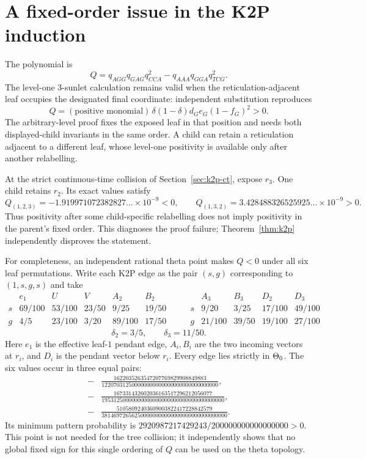 \documentclass[11pt]{article}
\theoremstyle{remark}\newtheorem{remark}[theorem]{Remark}
\begin{document}
\section{A fixed-order issue in the K2P induction}\label{sec:induction}
The polynomial is
\begin{equation}\label{eq:Q}Q=q_{AGG}q_{GAG}q_{CCA}^{2}-q_{AAA}q_{GGA}q_{TCG}^{2}.\end{equation}
The level-one 3-sunlet calculation remains valid when the reticulation-adjacent leaf occupies the designated final coordinate: independent substitution reproduces
\[
Q=(\text{positive monomial})\,\delta(1-\delta)d_Ge_G(1-f_G)^2>0.
\]
The arbitrary-level proof fixes the exposed leaf in that position and needs both displayed-child invariants in the same order. A child can retain a reticulation adjacent to a different leaf, whose level-one positivity is available only after another relabelling.

At the strict continuous-time collision of Section~\ref{sec:k2p-ct}, expose $r_3$. One child retains $r_2$. Its exact values satisfy
\[
Q_{(1,2,3)}=-1.919971072382827\ldots\times10^{-9}<0,\qquad Q_{(1,3,2)}=3.428488326525925\ldots\times10^{-9}>0.
\]
Thus positivity after some child-specific relabelling does not imply positivity in the parent's fixed order. This diagnoses the proof failure; Theorem~\ref{thm:k2p} independently disproves the statement.

For completeness, an independent rational theta point makes $Q<0$ under all six leaf permutations. Write each K2P edge as the pair $(s,g)$ corresponding to $(1,s,g,s)$ and take
\[
\begin{array}{c|ccccc}
 &e_1&U&V&A_2&B_2\\\hline
s&69/100&53/100&23/50&9/25&19/50\\
g&4/5&23/100&3/20&89/100&17/50
\end{array}
\qquad
\begin{array}{c|cccc}
 &A_3&B_3&D_2&D_3\\\hline
s&9/20&3/25&17/100&49/100\\
g&21/100&39/50&19/100&27/100
\end{array}
\]
\[
\delta_2=3/5,\qquad\delta_3=11/50.
\]
Here $e_1$ is the effective leaf-$1$ pendant edge, $A_i,B_i$ are the two incoming vectors at $r_i$, and $D_i$ is the pendant vector below $r_i$. Every edge lies strictly in $\Theta_0$. The six values occur in three equal pairs:
\begin{align*}
-&\frac{1622035263547207769829908849883}{122070312500000000000000000000000000000},\\
-&\frac{167331432602036163517296212056077}{19531250000000000000000000000000000000000},\\
-&\frac{51058092403609003822417228842579}{381469726562500000000000000000000000000000}.
\end{align*}
Its minimum pattern probability is $2920987217429243/200000000000000000>0$. This point is not needed for the tree collision; it independently shows that no global fixed sign for this single ordering of $Q$ can be used on the theta topology.
\end{document}
